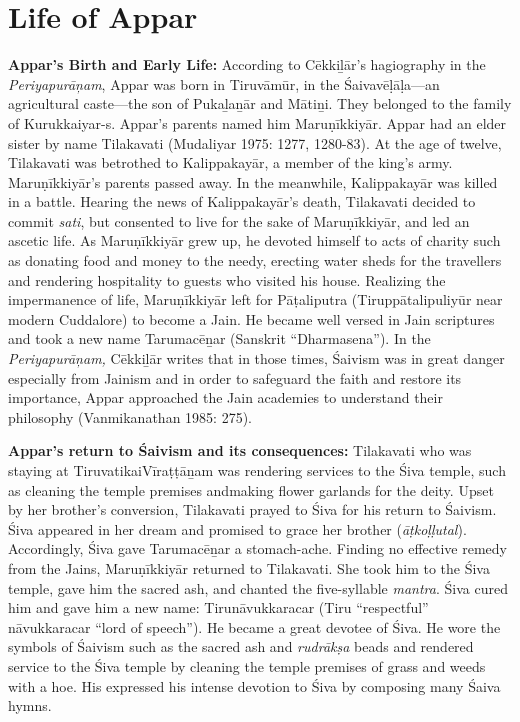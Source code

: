 \section*{Life of Appar}

\textbf{Appar’s Birth and Early Life:} According to Cēkkiḻār’s hagiography in the \textit{Periyapurāņam}, Appar was born in Tiruvāmūr, in the Śaivavēḷāḷa—an agricultural caste—the son of Pukaḻaṉār and Mātiṉi. They belonged to the family of Kurukkaiyar-s. Appar’s parents named him Maruṇīkkiyār. Appar had an elder sister by name Tilakavati (Mudaliyar 1975: 1277, 1280-83). At the age of twelve, Tilakavati was betrothed to Kalippakayār, a member of the king’s army. Maruṇīkkiyār’s parents passed away. In the meanwhile, Kalippakayār was killed in a battle. Hearing the news of Kalippakayār’s death, Tilakavati decided to commit \textit{sati}, but consented to live for the sake of Maruṇīkkiyār, and led an ascetic life. As Maruṇīkkiyār grew up, he devoted himself to acts of charity such as donating food and money to the needy, erecting water sheds for the travellers and rendering hospitality to guests who visited his house. Realizing the impermanence of life, Maruṇīkkiyār left for Pāṭaliputra (Tiruppātalipuliyūr near modern Cuddalore) to become a Jain. He became well versed in Jain scriptures and took a new name Tarumacēṉar (Sanskrit “Dharmasena”). In the \textit{Periyapurāņam, }Cēkkiḻār writes that in those times, Śaivism was in great danger especially from Jainism and in order to safeguard the faith and restore its importance, Appar approached the Jain academies to understand their philosophy (Vanmikanathan 1985: 275). 

\textbf{Appar’s return to Śaivism and its consequences:} Tilakavati who was staying at TiruvatikaiVīraṭṭāṉam was rendering services to the Śiva temple, such as cleaning the temple premises andmaking flower garlands for the deity. Upset by her brother’s conversion, Tilakavati prayed to Śiva for his return to Śaivism. Śiva appeared in her dream and promised to grace her brother (\textit{āṭkoḷḷutal}). Accordingly, Śiva gave Tarumacēṉar a stomach-ache. Finding no effective remedy from the Jains, Maruṇīkkiyār returned to Tilakavati. She took him to the Śiva temple, gave him the sacred ash, and chanted the five-syllable \textit{mantra}. Śiva cured him and gave him a new name: Tirunāvukkaracar (Tiru “respectful” nāvukkaracar “lord of speech”). He became a great devotee of Śiva. He wore the symbols of Śaivism such as the sacred ash and \textit{rudrākṣa} beads and rendered service to the Śiva temple by cleaning the temple premises of grass and weeds with a hoe. His expressed his intense devotion to Śiva by composing many Śaiva hymns.

